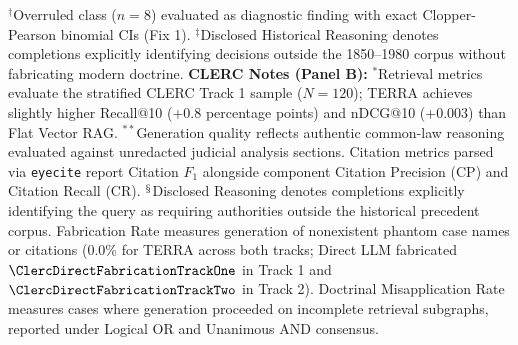 \begin{table}[!t]
$^\dagger$Overruled class ($n=8$) evaluated as diagnostic finding with exact Clopper-Pearson binomial CIs (Fix 1).
$^\ddagger$Disclosed Historical Reasoning denotes completions explicitly identifying decisions outside the 1850--1980 corpus without fabricating modern doctrine.
\textbf{CLERC Notes (Panel B):} $^*$Retrieval metrics evaluate the stratified CLERC Track 1 sample ($N=120$); TERRA achieves slightly higher Recall@10 (+0.8 percentage points) and nDCG@10 (+0.003) than Flat Vector RAG.
$^{**}$Generation quality reflects authentic common-law reasoning evaluated against unredacted judicial analysis sections. Citation metrics parsed via \texttt{eyecite} report Citation $F_1$ alongside component Citation Precision (CP) and Citation Recall (CR).
$^\mathsection$Disclosed Reasoning denotes completions explicitly identifying the query as requiring authorities outside the historical precedent corpus. Fabrication Rate measures generation of nonexistent phantom case names or citations (0.0\% for TERRA across both tracks; Direct LLM fabricated $\ClercDirectFabricationTrackOne$ in Track 1 and $\ClercDirectFabricationTrackTwo$ in Track 2). Doctrinal Misapplication Rate measures cases where generation proceeded on incomplete retrieval subgraphs, reported under Logical OR and Unanimous AND consensus.
\end{table}
